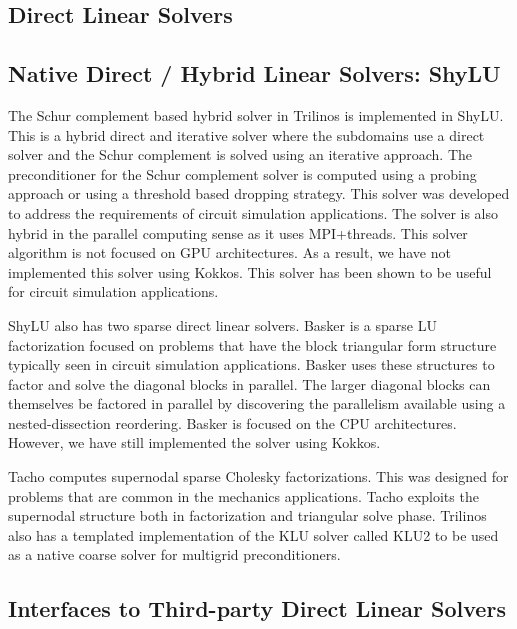 \subsection{Direct Linear Solvers}


\subsection{Native Direct / Hybrid Linear Solvers: ShyLU}
 The Schur complement based hybrid solver in Trilinos is implemented in ShyLU. This is a hybrid direct and iterative solver where the subdomains use a direct solver and the Schur complement is solved using an iterative approach. The preconditioner for the Schur complement solver is computed using a probing approach or using a threshold based dropping strategy. This solver was developed to address the requirements of circuit simulation applications. The solver is also hybrid in the parallel computing sense as it uses MPI+threads. This  solver algorithm is not focused on GPU architectures. As a result, we have not implemented this solver using Kokkos. This solver has been shown to be useful for circuit simulation applications.

 ShyLU also has two sparse direct linear solvers. Basker is a sparse LU factorization focused on problems that have the block triangular form structure typically seen in circuit simulation applications. Basker uses these structures to factor and solve the diagonal blocks in parallel. The larger diagonal blocks can themselves be factored in parallel by discovering the parallelism available using a nested-dissection reordering. Basker is focused on the CPU architectures. However, we have still implemented the solver using Kokkos. 

 Tacho computes supernodal sparse Cholesky factorizations. This was designed for problems that are common in the mechanics applications. Tacho exploits the supernodal structure both in factorization and triangular solve phase.  Trilinos also has a templated implementation of the KLU solver called KLU2 to be used as a native coarse solver for multigrid preconditioners.

\subsection{Interfaces to Third-party Direct Linear Solvers}
\label{sec:TPLDirectSolvers}


